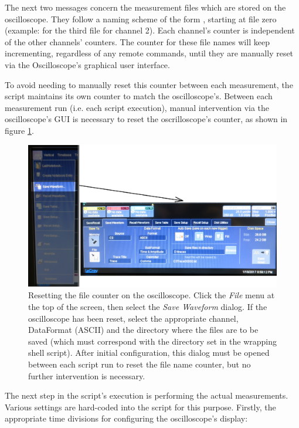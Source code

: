 The  next  two  messages  concern  the  measurement  files  which  are  stored
on   the  oscilloscope.    They   follow   a  naming   scheme   of  the   form
,   starting   at  file   zero   (example:
  for the  third  file for  channel 2). Each  channel's
counter is independent of the  other channels' counters. The counter for these
file names  will keep incrementing,  regardless of any remote  commands, until
they are manually reset via the Oscilloscope's graphical user interface.

To avoid needing to manually reset  this counter between each measurement, the
script maintains  its own  counter to  match the  oscilloscope's. Between each
measurement  run (i.e.  each script  execution), manual  intervention via  the
oscilloscope's GUI is necessary to reset the oscrilloscope's counter, as shown
in figure \ref{fig:fileCounterReset}.

\begin{figure}
    \centering
    \includegraphics[width=\textwidth]{images/expSetup/resetFilename.jpeg}
    \caption{%
        Resetting the file counter  on the oscilloscope. Click the \emph{File}
        menu at  the top of the  screen, then select the  \emph{Save Waveform}
        dialog.  If  the oscilloscope has  been reset, select  the appropriate
        channel, DataFormat (ASCII)  and the directory where the  files are to
        be saved (which must correspond with the directory set in the wrapping
        shell script). After initial configuration, this dialog must be opened
        between each script run to reset the file name counter, but no further
        intervention is necessary.%
    }
    \label{fig:fileCounterReset}
\end{figure}

The  next   step  in   the  script's  execution   is  performing   the  actual
measurements. Various  settings  are  hard-coded  into  the  script  for  this
purpose. Firstly,  the   appropriate  time   divisions  for   configuring  the
oscilloscope's display\footnotemark:

